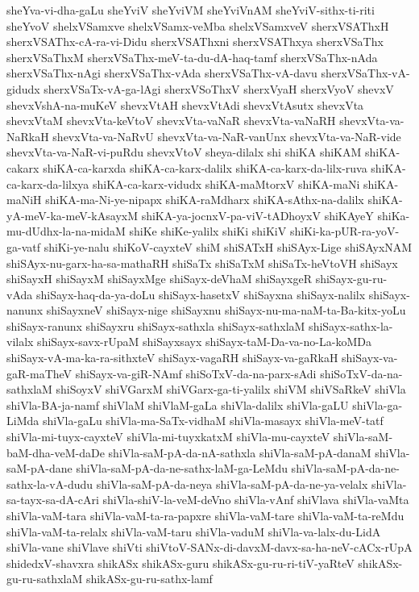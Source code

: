 {sheYva-vi-dha-gaLu
sheYviV
sheYviVM
sheYviVnAM
sheYviV-sithx-ti-riti
sheYvoV
shelxVSamxve
shelxVSamx-veMba
shelxVSamxveV
sherxVSAThxH
sherxVSAThx-cA-ra-vi-Didu
sherxVSAThxni
sherxVSAThxya
sherxVSaThx
sherxVSaThxM
sherxVSaThx-meV-ta-du-dA-haq-tamf
sherxVSaThx-nAda
sherxVSaThx-nAgi
sherxVSaThx-vAda
sherxVSaThx-vA-davu
sherxVSaThx-vA-gidudx
sherxVSaTx-vA-ga-lAgi
sherxVSoThxV
sherxVyaH
sherxVyoV
shevxV
shevxVshA-na-muKeV
shevxVtAH
shevxVtAdi
shevxVtAsutx
shevxVta
shevxVtaM
shevxVta-keVtoV
shevxVta-vaNaR
shevxVta-vaNaRH
shevxVta-va-NaRkaH
shevxVta-va-NaRvU
shevxVta-va-NaR-vanUnx
shevxVta-va-NaR-vide
shevxVta-va-NaR-vi-puRdu
shevxVtoV
sheya-dilalx
shi
shiKA
shiKAM
shiKA-cakarx
shiKA-ca-karxda
shiKA-ca-karx-dalilx
shiKA-ca-karx-da-lilx-ruva
shiKA-ca-karx-da-lilxya
shiKA-ca-karx-vidudx
shiKA-maMtorxV
shiKA-maNi
shiKA-maNiH
shiKA-ma-Ni-ye-nipapx
shiKA-raMdharx
shiKA-sAthx-na-dalilx
shiKA-yA-meV-ka-meV-kAsayxM
shiKA-ya-jocnxV-pa-viV-tADhoyxV
shiKAyeY
shiKa-mu-dUdhx-la-na-midaM
shiKe
shiKe-yalilx
shiKi
shiKiV
shiKi-ka-pUR-ra-yoV-ga-vatf
shiKi-ye-nalu
shiKoV-cayxteV
shiM
shiSATxH
shiSAyx-Lige
shiSAyxNAM
shiSAyx-nu-garx-ha-sa-mathaRH
shiSaTx
shiSaTxM
shiSaTx-heVtoVH
shiSayx
shiSayxH
shiSayxM
shiSayxMge
shiSayx-deVhaM
shiSayxgeR
shiSayx-gu-ru-vAda
shiSayx-haq-da-ya-doLu
shiSayx-hasetxV
shiSayxna
shiSayx-nalilx
shiSayx-nanunx
shiSayxneV
shiSayx-nige
shiSayxnu
shiSayx-nu-ma-naM-ta-Ba-kitx-yoLu
shiSayx-ranunx
shiSayxru
shiSayx-sathxla
shiSayx-sathxlaM
shiSayx-sathx-la-vilalx
shiSayx-savx-rUpaM
shiSayxsayx
shiSayx-taM-Da-va-no-La-koMDa
shiSayx-vA-ma-ka-ra-sithxteV
shiSayx-vagaRH
shiSayx-va-gaRkaH
shiSayx-va-gaR-maTheV
shiSayx-va-giR-NAmf
shiSoTxV-da-na-parx-sAdi
shiSoTxV-da-na-sathxlaM
shiSoyxV
shiVGarxM
shiVGarx-ga-ti-yalilx
shiVM
shiVSaRkeV
shiVla
shiVla-BA-ja-namf
shiVlaM
shiVlaM-gaLa
shiVla-dalilx
shiVla-gaLU
shiVla-ga-LiMda
shiVla-gaLu
shiVla-ma-SaTx-vidhaM
shiVla-masayx
shiVla-meV-tatf
shiVla-mi-tuyx-cayxteV
shiVla-mi-tuyxkatxM
shiVla-mu-cayxteV
shiVla-saM-baM-dha-veM-daDe
shiVla-saM-pA-da-nA-sathxla
shiVla-saM-pA-danaM
shiVla-saM-pA-dane
shiVla-saM-pA-da-ne-sathx-laM-ga-LeMdu
shiVla-saM-pA-da-ne-sathx-la-vA-dudu
shiVla-saM-pA-da-neya
shiVla-saM-pA-da-ne-ya-velalx
shiVla-sa-tayx-sa-dA-cAri
shiVla-shiV-la-veM-deVno
shiVla-vAnf
shiVlava
shiVla-vaMta
shiVla-vaM-tara
shiVla-vaM-ta-ra-papxre
shiVla-vaM-tare
shiVla-vaM-ta-reMdu
shiVla-vaM-ta-relalx
shiVla-vaM-taru
shiVla-vaduM
shiVla-va-lalx-du-LidA
shiVla-vane
shiVlave
shiVti
shiVtoV-SANx-di-davxM-davx-sa-ha-neV-cACx-rUpA
shidedxV-shavxra
shikASx
shikASx-guru
shikASx-gu-ru-ri-tiV-yaRteV
shikASx-gu-ru-sathxlaM
shikASx-gu-ru-sathx-lamf
}
